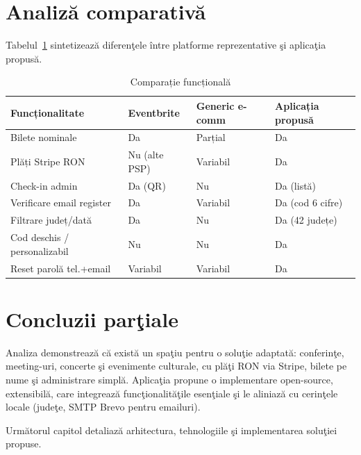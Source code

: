 \section{Analiz\u a comparativ\u a}

Tabelul~\ref{tab:comparatie} sintetizeaz\u a diferen\c tele \^intre platforme reprezentative \c si aplica\c tia propus\u a.

\begin{table}[htbp]
	\centering
	\begin{tabular}{|p{3.5cm}|p{2.2cm}|p{2.5cm}|p{3.5cm}|}
		\hline
		\textbf{Funcționalitate} & \textbf{Eventbrite} & \textbf{Generic e-comm} & \textbf{Aplicația propusă} \\ \hline
		Bilete nominale & Da & Parțial & Da \\ \hline
		Plăți Stripe RON & Nu (alte PSP) & Variabil & Da \\ \hline
		Check-in admin & Da (QR) & Nu & Da (listă) \\ \hline
		Verificare email register & Da & Variabil & Da (cod 6 cifre) \\ \hline
		Filtrare județ/dată & Da & Nu & Da (42 județe) \\ \hline
		Cod deschis / personalizabil & Nu & Nu & Da \\ \hline
		Reset parolă tel.+email & Variabil & Variabil & Da \\ \hline
	\end{tabular}
	\caption{Comparație funcțională}
	\label{tab:comparatie}
\end{table}

\section{Concluzii par\c tiale}

Analiza demonstreaz\u a c\u a exist\u a un spa\c tiu pentru o solu\c tie adaptat\u a: conferin\c te, meeting-uri, concerte \c si evenimente culturale, cu pl\u a\c ti RON via Stripe, bilete pe nume \c si administrare simpl\u a. Aplica\c tia propune o implementare open-source, extensibil\u a, care integreaz\u a func\c tionalit\u a\c tile esen\c tiale \c si le aliniaz\u a cu cerin\c tele locale (jude\c te, SMTP Brevo pentru emailuri).

\vspace{0.3cm}
\noindent Urm\u atorul capitol detaliaz\u a arhitectura, tehnologiile \c si implementarea solu\c tiei propuse.
